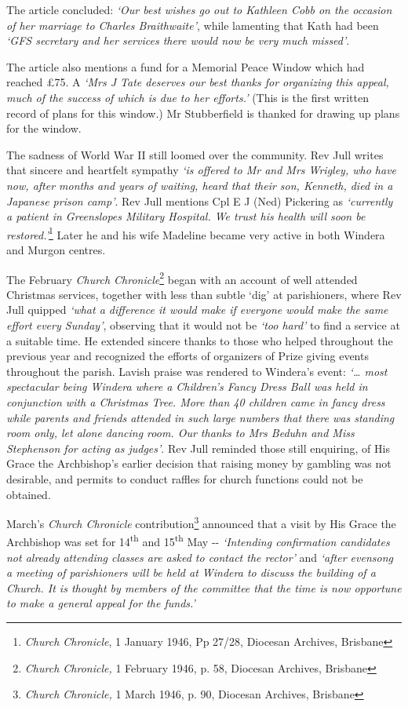 The article concluded: \emph{`Our best wishes go out to Kathleen Cobb on the occasion of her marriage to Charles Braithwaite'}, while lamenting that Kath had been \emph{`GFS secretary and her services there would now be very much missed'}.

The article also mentions a fund for a Memorial Peace Window which had reached £75. A \emph{`Mrs J Tate deserves our best thanks for organizing this appeal, much of the success of which is due to her efforts.'} (This is the first written record of plans for this window.) Mr Stubberfield is thanked for drawing up plans for the window.

The sadness of World War II still loomed over the community. Rev Jull writes that sincere and heartfelt sympathy \emph{`is offered to Mr and Mrs Wrigley, who have now, after months and years of waiting, heard that their son, Kenneth, died in a Japanese prison camp'}. Rev Jull mentions Cpl E J (Ned) Pickering as \emph{`currently a patient in Greenslopes Military Hospital. We trust his health will soon be restored.'}\footnote{\emph{Church Chronicle}, 1 January 1946, Pp 27/28, Diocesan Archives, Brisbane} Later he and his wife Madeline became very active in both Windera and Murgon centres.

The February \emph{Church Chronicle}\footnote{\emph{Church Chronicle,} 1 February 1946, p. 58, Diocesan Archives, Brisbane} began with an account of well attended Christmas services, together with less than subtle `dig' at parishioners, where Rev Jull quipped \emph{`what a difference it would make if everyone would make the same effort every Sunday'}, observing that it would not be \emph{`too hard'} to find a service at a suitable time. He extended sincere thanks to those who helped throughout the previous year and recognized the efforts of organizers of Prize giving events throughout the parish. Lavish praise was rendered to Windera's event: \emph{`\ldots{} most spectacular being Windera where a Children's Fancy Dress Ball was held in conjunction with a Christmas Tree. More than 40 children came in fancy dress while parents and friends attended in such large numbers that there was standing room only, let alone dancing room. Our thanks to Mrs Beduhn and Miss Stephenson for acting as judges'}. Rev Jull reminded those still enquiring, of His Grace the Archbishop's earlier decision that raising money by gambling was not desirable, and permits to conduct raffles for church functions could not be obtained.

March's \emph{Church Chronicle} contribution\footnote{\emph{Church Chronicle,} 1 March 1946, p. 90, Diocesan Archives, Brisbane} announced that a visit by His Grace the Archbishop was set for 14\textsuperscript{th} and 15\textsuperscript{th} May -\/- \emph{`Intending confirmation candidates not already attending classes are asked to contact the rector'} and \emph{`after evensong a meeting of parishioners will be held at Windera to discuss the building of a Church. It is thought by members of the committee that the time is now opportune to make a general appeal for the funds.'}

